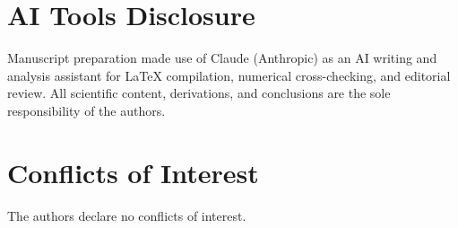 \documentclass[12pt,a4paper]{article}
\theoremstyle{remark}
\begin{document}
\section*{AI Tools Disclosure}

Manuscript preparation made use of Claude (Anthropic) as an AI writing and
analysis assistant for \LaTeX{} compilation, numerical cross-checking, and
editorial review. All scientific content, derivations, and conclusions are
the sole responsibility of the authors.

\section*{Conflicts of Interest}

The authors declare no conflicts of interest.
\end{document}
